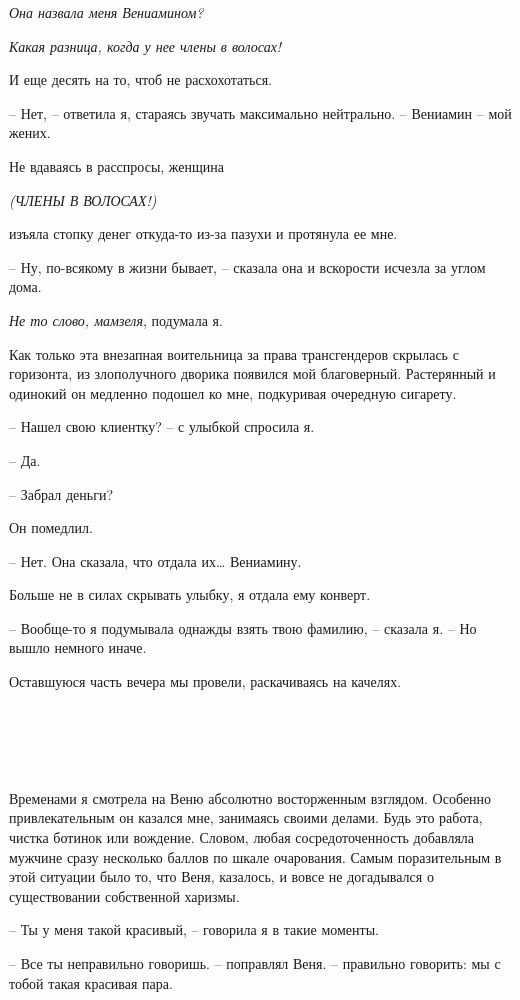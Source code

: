 \documentclass[
]{book}
\begin{document}
\emph{Она назвала меня Вениамином?}

\emph{Какая разница, когда у нее члены в волосах! }

И еще десять на то, чтоб не расхохотаться.

-- Нет, -- ответила я, стараясь звучать максимально нейтрально. -- Вениамин -- мой жених.

Не вдаваясь в расспросы, женщина

\emph{(ЧЛЕНЫ В ВОЛОСАХ!)}

изъяла стопку денег откуда-то из-за пазухи и протянула ее мне.

-- Ну, по-всякому в жизни бывает, -- сказала она и вскорости исчезла за углом дома.

\emph{Не то слово, мамзеля}, подумала я.

Как только эта внезапная воительница за права трансгендеров скрылась с горизонта, из злополучного дворика появился мой благоверный. Растерянный и одинокий он медленно подошел ко мне, подкуривая очередную сигарету.

-- Нашел свою клиентку? -- с улыбкой спросила я.

-- Да.

-- Забрал деньги?

Он помедлил.

-- Нет. Она сказала, что отдала их\ldots{} Вениамину.

Больше не в силах скрывать улыбку, я отдала ему конверт.

-- Вообще-то я подумывала однажды взять твою фамилию, -- сказала я. -- Но вышло немного иначе.

Оставшуюся часть вечера мы провели, раскачиваясь на качелях.

\hypertarget{chapter-21}{%
\chapter{~}\label{chapter-21}}

Временами я смотрела на Веню абсолютно восторженным взглядом. Особенно привлекательным он казался мне, занимаясь своими делами. Будь это работа, чистка ботинок или вождение. Словом, любая сосредоточенность добавляла мужчине сразу несколько баллов по шкале очарования. Самым поразительным в этой ситуации было то, что Веня, казалось, и вовсе не догадывался о существовании собственной харизмы.

-- Ты у меня такой красивый, -- говорила я в такие моменты.

-- Все ты неправильно говоришь. -- поправлял Веня. -- правильно говорить: мы с тобой такая красивая пара.
\end{document}
